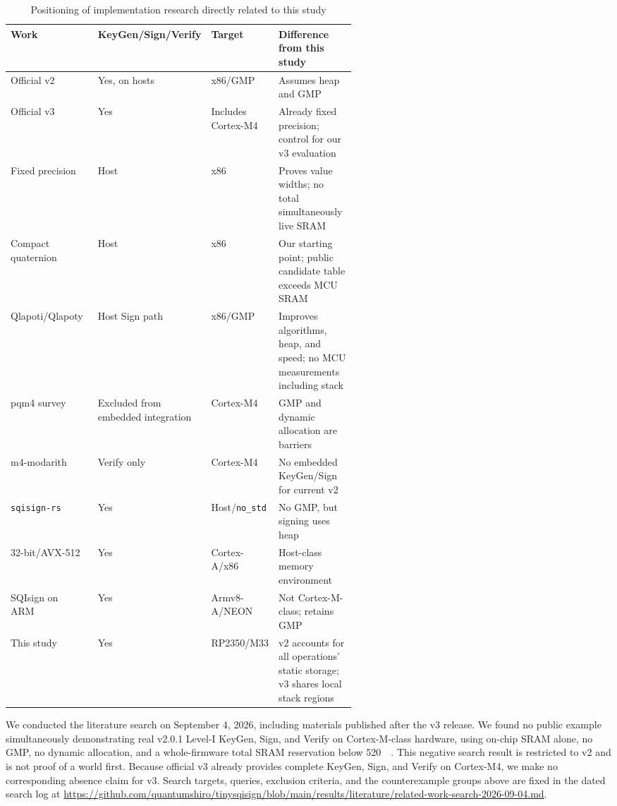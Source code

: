 \documentclass[a4paper,10pt]{article}
\theoremstyle{definition}
\theoremstyle{remark}
\begin{document}
\begin{table}[H]
  \centering
  \caption{Positioning of implementation research directly related to this study}
  \label{tab:related-matrix}
  \scriptsize
  \begin{tabularx}{\linewidth}{@{}p{0.21\linewidth}p{0.18\linewidth}p{0.18\linewidth}X@{}}
    \toprule
    Work & KeyGen/Sign/Verify & Target & Difference from this study \\
    \midrule
    Official v2~\cite{sqisign-spec-v201} & Yes, on hosts & x86/GMP & Assumes heap and GMP \\
    Official v3~\cite{sqisign-spec-v3} & Yes & Includes Cortex-M4 & Already fixed precision; control for our v3 evaluation \\
    Fixed precision~\cite{fixed-precision-2025} & Host & x86 & Proves value widths; no total simultaneously live SRAM \\
    Compact quaternion~\cite{compact-quaternion-2026} & Host & x86 & Our starting point; public candidate table exceeds MCU SRAM \\
    Qlapoti/\allowbreak Qlapoty~\cite{qlapoti-2025,qlapoty-2026} & Host Sign path & x86/GMP & Improves algorithms, heap, and speed; no MCU measurements including stack \\
    pqm4 survey~\cite{pqm4-2024} & Excluded from embedded integration & Cortex-M4 & GMP and dynamic allocation are barriers \\
    m4-\allowbreak modarith~\cite{m4-modarith-2025} & Verify only & Cortex-M4 & No embedded KeyGen/Sign for current v2 \\
    \texttt{sqisign-rs}~\cite{sqisign-rs-2026} & Yes & Host/\texttt{no\_std} & No GMP, but signing uses heap \\
    32-bit/AVX-512~\cite{sqisign-32bit-2024,sqisign-avx512-2026} & Yes & Cortex-A/x86 & Host-class memory environment \\
    SQIsign on ARM~\cite{sqisign-arm-2026} & Yes & Armv8-A/NEON & Not Cortex-M-class; retains GMP \\
    This study & Yes & RP2350/M33 & v2 accounts for all operations' static storage; v3 shares local stack regions \\
    \bottomrule
  \end{tabularx}
\end{table}

We conducted the literature search on September 4, 2026, including materials published after the v3 release. We found no public example simultaneously demonstrating real v2.0.1 Level-I KeyGen, Sign, and Verify on Cortex-M-class hardware, using on-chip SRAM alone, no GMP, no dynamic allocation, and a whole-firmware total SRAM reservation below \SI{520}{\kibi\byte}. This negative search result is restricted to v2 and is not proof of a world first. Because official v3 already provides complete KeyGen, Sign, and Verify on Cortex-M4, we make no corresponding absence claim for v3. Search targets, queries, exclusion criteria, and the counterexample groups above are fixed in the dated search log at \url{https://github.com/quantumshiro/tinysqisign/blob/main/results/literature/related-work-search-2026-09-04.md}.
\end{document}
